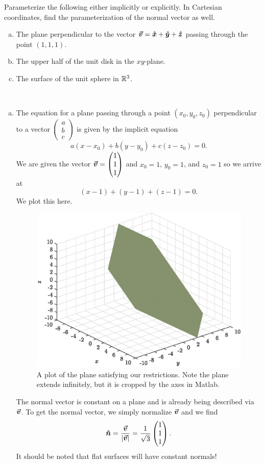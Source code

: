 \documentclass[12pt]{article} %
\newcommand{\unitvec}{\boldsymbol{\hat{n}}}
\begin{document}
\newpage
\begin{problem} 
Parameterize the following either implicitly or explicitly. In Cartesian coordinates, find the parameterization of the normal vector as well.
\begin{enumerate}[(a)]
	\item The plane perpendicular to the vector $\boldsymbol{\vec{v}} = \boldsymbol{\hat{x}} + \boldsymbol{\hat{y}} + \boldsymbol{\hat{z}}$ passing through the point $(1,1,1)$.
	\item The upper half of the unit disk in the $xy$-plane.
	\item The surface of the unit sphere in $\mathbb{R}^3$.
\end{enumerate}
\end{problem}
\begin{solution}~
\begin{enumerate}[(a)]
    \item The equation for a plane passing through a point $(x_0,y_0,z_0)$ perpendicular to a vector $\begin{pmatrix} a \\ b \\ c \end{pmatrix}$ is given by the implicit equation
    \[
    a(x-x_0)+b(y-y_0) + c(z-z_0) = 0.
    \]
    We are given the vector $\boldsymbol{\vec{v}} = \begin{pmatrix} 1 \\ 1 \\ 1 \end{pmatrix}$ and $x_0=1$, $y_0=1$, and $z_0=1$ so we arrive at
    \[ 
    (x-1)+(y-1)+(z-1)=0.
    \]
    We plot this here.
    \begin{figure}[H]
        \centering
        \includegraphics[width=.6\textwidth]{figures/plane}
        \caption{A plot of the plane satisfying our restrictions. Note the plane extends infinitely, but it is cropped by the axes in Matlab.}
    \end{figure}
    The normal vector is constant on a plane and is already being described via $\boldsymbol{\vec{v}}$. To get the normal vector, we simply normalize $\boldsymbol{\vec{v}}$ and we find
    \[
    \unitvec = \frac{\vecv}{|\vecv|} = \frac{1}{\sqrt{3}} \begin{pmatrix} 1 \\ 1 \\ 1 \end{pmatrix}.
    \]
    It should be noted that flat surfaces will have constant normals!


\end{enumerate}
\end{solution}
\end{document}
